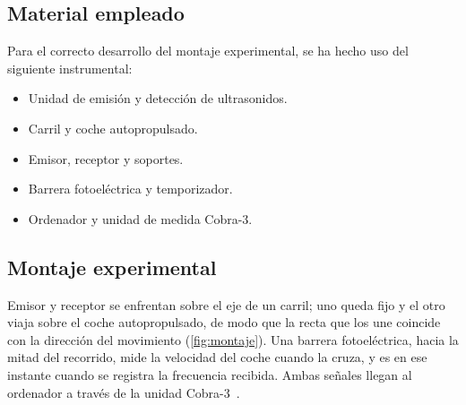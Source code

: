 \documentclass[a4paper,11pt]{amsart}
\numberwithin{equation}{section}
\theoremstyle{cienplano}
\theoremstyle{ciendef}
\theoremstyle{cienobs}
\begin{document}
\subsection{Material empleado}\label{sec:material}
Para el correcto desarrollo del montaje experimental, se ha hecho uso del siguiente instrumental:
\begin{itemize}
    \item Unidad de emisión y detección de ultrasonidos.
    \item Carril y coche autopropulsado.
    \item Emisor, receptor y soportes.
    \item Barrera fotoeléctrica y temporizador.
    \item Ordenador y unidad de medida Cobra-3.
\end{itemize}

\subsection{Montaje experimental}\label{sec:montaje}
Emisor y receptor se enfrentan sobre el eje de un carril; uno queda fijo y el
otro viaja sobre el coche autopropulsado, de modo que la recta que los une
coincide con la dirección del movimiento (\cref{fig:montaje}). Una barrera
fotoeléctrica, hacia la mitad del recorrido, mide la velocidad del coche
cuando la cruza, y es en ese instante cuando se registra la frecuencia
recibida. Ambas señales llegan al ordenador a través de la unidad
Cobra-3~\cite{GUION-P8}.
\end{document}
